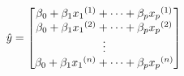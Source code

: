 \documentclass[preview]{standalone}
\begin{document}
\begin{align*}
\special{dvisvgm:raw <g id='unique000'>}\hat{y}=\begin{bmatrix}\beta_0+\beta_1 {x_1}^{(1)}+\cdots+\beta_p {x_p}^{(1)}\\\beta_0+\beta_1 {x_1}^{(2)}+\cdots+\beta_p {x_p}^{(2)}\\\vdots\\\beta_0+\beta_1 {x_1}^{(n)}+\cdots+\beta_p {x_p}^{(n)}\end{bmatrix}\special{dvisvgm:raw </g>}
\end{align*}
\end{document}
